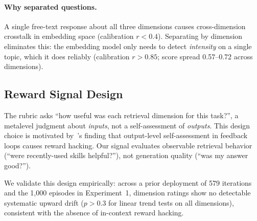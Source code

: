 \paragraph{Why separated questions.}
A single free-text response about all three dimensions causes cross-dimension crosstalk in embedding space (calibration $r < 0.4$).
Separating by dimension eliminates this: the embedding model only needs to detect \emph{intensity} on a single topic, which it does reliably (calibration $r > 0.85$; score spread 0.57--0.72 across dimensions).

\subsection{Reward Signal Design}
\label{sec:reward_design}

The rubric asks ``how useful was each retrieval dimension for this task?'', a metalevel judgment about \emph{inputs}, not a self-assessment of \emph{outputs}.
This design choice is motivated by~\citet{pan2024feedback}'s finding that output-level self-assessment in feedback loops causes reward hacking.
Our signal evaluates observable retrieval behavior (``were recently-used skills helpful?''), not generation quality (``was my answer good?'').

We validate this design empirically: across a prior deployment of 579 iterations and the 1,000 episodes in Experiment~1, dimension ratings show no detectable systematic upward drift ($p > 0.3$ for linear trend tests on all dimensions), consistent with the absence of in-context reward hacking.
